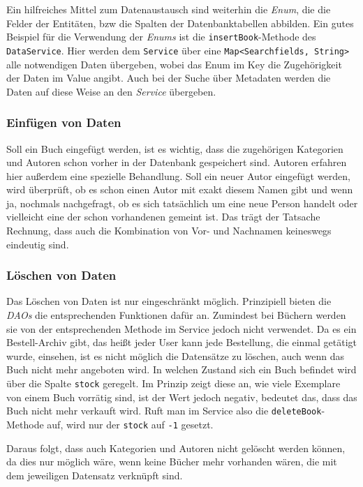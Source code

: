 		Ein hilfreiches Mittel zum Datenaustausch sind weiterhin die \textit{Enum}, die die Felder der Entitäten, bzw die Spalten der Datenbanktabellen abbilden. Ein gutes Beispiel für die Verwendung der \textit{Enums} ist die \texttt{insertBook}-Methode des \texttt{DataService}. Hier werden dem \texttt{Service} über eine \texttt{Map\textless Searchfields, String\textgreater } alle notwendigen Daten übergeben, wobei das Enum im Key die Zugehörigkeit der Daten im Value angibt. Auch bei der Suche über Metadaten werden die Daten auf diese Weise an den \textit{Service} übergeben.
		
		\subsubsection{Einfügen von Daten}\label{umsetzung:DB:Einfuegen}
		Soll ein Buch eingefügt werden, ist es wichtig, dass die zugehörigen Kategorien und Autoren schon vorher in der Datenbank gespeichert sind. Autoren erfahren hier außerdem eine spezielle Behandlung. Soll ein neuer Autor eingefügt werden, wird überprüft, ob es schon einen Autor mit exakt diesem Namen gibt und wenn ja, nochmals nachgefragt, ob es sich tatsächlich um eine neue Person handelt oder vielleicht eine der schon vorhandenen gemeint ist. Das trägt der Tatsache Rechnung, dass auch die Kombination von Vor- und Nachnamen keineswegs eindeutig sind. 
		
		\subsubsection{Löschen von Daten}\label{umsetzung:DB:Loeschen}
		Das Löschen von Daten ist nur eingeschränkt möglich. Prinzipiell bieten die \textit{DAOs} die entsprechenden Funktionen dafür an. Zumindest bei Büchern werden sie von der entsprechenden Methode im Service jedoch nicht verwendet. Da es ein Bestell-Archiv gibt, das heißt jeder User kann jede Bestellung, die einmal getätigt wurde, einsehen, ist es nicht möglich die Datensätze zu löschen, auch wenn das Buch nicht mehr angeboten wird. In welchen Zustand sich ein Buch befindet wird über die Spalte \texttt{stock} geregelt. Im Prinzip zeigt diese an, wie viele Exemplare von einem Buch vorrätig sind, ist der Wert jedoch negativ, bedeutet das, dass das Buch nicht mehr verkauft wird. Ruft man im Service also die \texttt{deleteBook}-Methode auf, wird nur der \texttt{stock} auf \texttt{-1} gesetzt.
		
		Daraus folgt, dass auch Kategorien und Autoren nicht gelöscht werden können, da dies nur möglich wäre, wenn keine Bücher mehr vorhanden wären, die mit dem jeweiligen Datensatz verknüpft sind.
		
